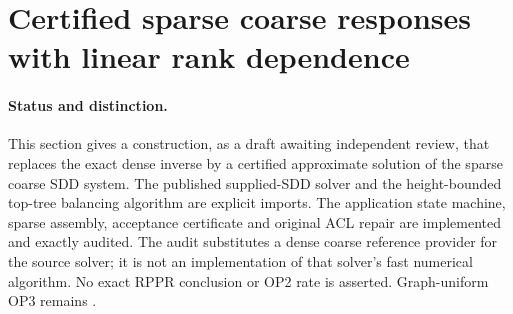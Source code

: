 \section[Certified sparse coarse solves]{Certified sparse coarse responses with linear rank dependence}
\label{sec:op3-certified-coarse-sdd}

\paragraph{Status and distinction.}
This section gives a \statusproved{} construction, as a draft awaiting
independent review, that replaces the exact dense inverse by a certified
approximate solution of the sparse coarse SDD system. The published
supplied-SDD solver and the height-bounded top-tree balancing algorithm
are explicit \statussource{} imports. The application state machine,
sparse assembly, acceptance certificate and original ACL repair are
implemented and exactly audited. The audit substitutes a dense coarse
reference provider for the source solver; it is not an implementation of
that solver's fast numerical algorithm. No exact RPPR conclusion or OP2
rate is asserted. Graph-uniform OP3 remains \statusopen{}.

